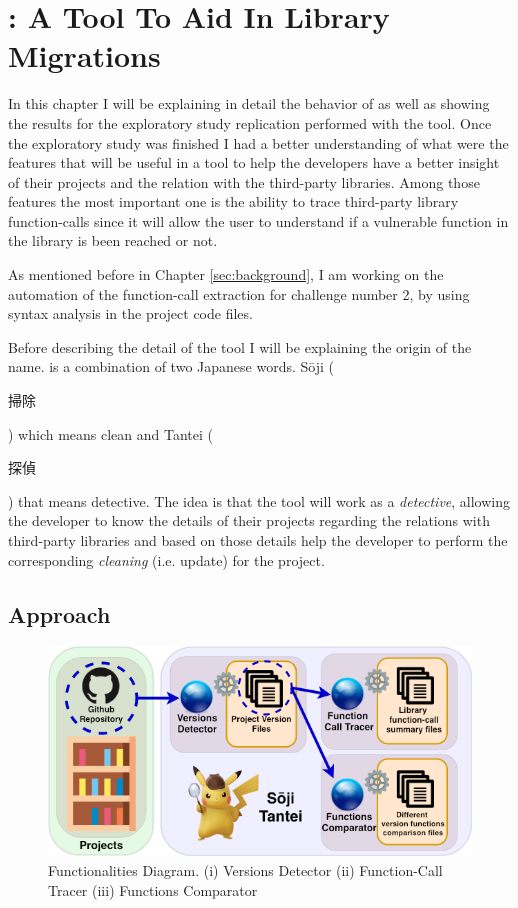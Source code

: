 \chapter{\texorpdfstring{\tool[]}{SojiTantei}: A Tool To Aid In Library Migrations}
\label{sec:specification}

In this chapter I will be explaining in detail the behavior of \tool[] as well as showing the results for the exploratory study replication performed with the tool.
Once the exploratory study was finished I had a better understanding of what were the features that will be useful in a tool to help the developers have a better insight of their projects and the relation with the third-party libraries. Among those features the most important one is the ability to trace third-party library function-calls since it will allow the user to understand if a vulnerable function in the library is been reached or not.

As mentioned before in Chapter \ref{sec:background}, I am working on the automation of the function-call extraction for challenge number 2, by using syntax analysis in the project code files. 

Before describing the detail of the tool I will be explaining the origin of the name. \tool[] is a combination of two Japanese words. S\={o}ji (\begin{CJK}{UTF8}{min}掃除\end{CJK}) which means clean and Tantei (\begin{CJK}{UTF8}{min}探偵\end{CJK})
that means detective. The idea is that the tool will work as a \textit{detective}, allowing the developer to know the details of their projects regarding the relations with third-party libraries and based on those details help the developer to perform the corresponding \textit{cleaning} (i.e. update) for the project.

\section{Approach}
\begin{figure}[ht!]
\centering
\includegraphics[width=1\textwidth]{images/tool_approach.png}
\caption{\tool[] Functionalities Diagram. (i) Versions Detector (ii) Function-Call Tracer (iii) Functions Comparator}
\label{fig:sojiApproach}
\end{figure}

